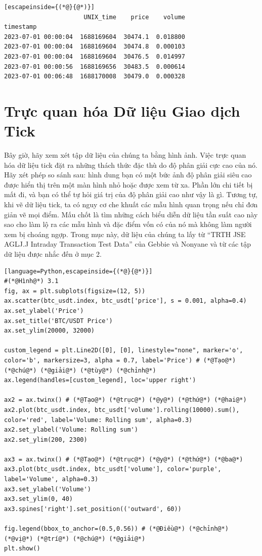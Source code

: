 \begin{lstlisting}[escapeinside={(*@}{@*)}]
                      UNIX_time    price    volume
timestamp                                         
2023-07-01 00:00:04  1688169604  30474.1  0.018800
2023-07-01 00:00:04  1688169604  30474.8  0.000103
2023-07-01 00:00:04  1688169604  30476.5  0.014997
2023-07-01 00:00:56  1688169656  30483.5  0.000614
2023-07-01 00:06:48  1688170008  30479.0  0.000328
\end{lstlisting}

\section{Trực quan hóa Dữ liệu Giao dịch Tick}

Bây giờ, hãy xem xét tập dữ liệu của chúng ta bằng hình ảnh. Việc trực quan hóa dữ liệu tick đặt ra những thách thức đặc thù do độ phân giải cực cao của nó. Hãy xét phép so sánh sau: hình dung bạn có một bức ảnh độ phân giải siêu cao được hiển thị trên một màn hình nhỏ hoặc được xem từ xa. Phần lớn chi tiết bị mất đi, và bạn có thể tự hỏi giá trị của độ phân giải cao như vậy là gì. Tương tự, khi vẽ dữ liệu tick, ta có nguy cơ che khuất các mẫu hình quan trọng nếu chỉ đơn giản vẽ mọi điểm. Mấu chốt là tìm những cách biểu diễn dữ liệu tần suất cao này sao cho làm lộ ra các mẫu hình và đặc điểm vốn có của nó mà không làm người xem bị choáng ngợp. Trong mục này, dữ liệu của chúng ta lấy từ ``TRTH JSE AGLJ.J Intraday Transaction Test Data'' của Gebbie và Nonyane và từ các tập dữ liệu được nhắc đến ở mục 2.

\begin{lstlisting}[language=Python,escapeinside={(*@}{@*)}]
#(*@Hình@*) 3.1
fig, ax = plt.subplots(figsize=(12, 5))
ax.scatter(btc_usdt.index, btc_usdt['price'], s = 0.001, alpha=0.4)
ax.set_ylabel('Price')
ax.set_title('BTC/USDT Price')
ax.set_ylim(20000, 32000)

custom_legend = plt.Line2D([0], [0], linestyle="none", marker='o', color='b', markersize=3, alpha = 0.7, label='Price') # (*@Tạo@*) (*@chú@*) (*@giải@*) (*@tùy@*) (*@chỉnh@*)
ax.legend(handles=[custom_legend], loc='upper right')

ax2 = ax.twinx() # (*@Tạo@*) (*@trục@*) (*@y@*) (*@thứ@*) (*@hai@*)
ax2.plot(btc_usdt.index, btc_usdt['volume'].rolling(10000).sum(), color='red', label='Volume: Rolling sum', alpha=0.3)
ax2.set_ylabel('Volume: Rolling sum')
ax2.set_ylim(200, 2300)

ax3 = ax.twinx() # (*@Tạo@*) (*@trục@*) (*@y@*) (*@thứ@*) (*@ba@*)
ax3.plot(btc_usdt.index, btc_usdt['volume'], color='purple', label='Volume', alpha=0.3)
ax3.set_ylabel('Volume')
ax3.set_ylim(0, 40)
ax3.spines['right'].set_position(('outward', 60))

fig.legend(bbox_to_anchor=(0.5,0.56)) # (*@Điều@*) (*@chỉnh@*) (*@vị@*) (*@trí@*) (*@chú@*) (*@giải@*)
plt.show()
\end{lstlisting}

